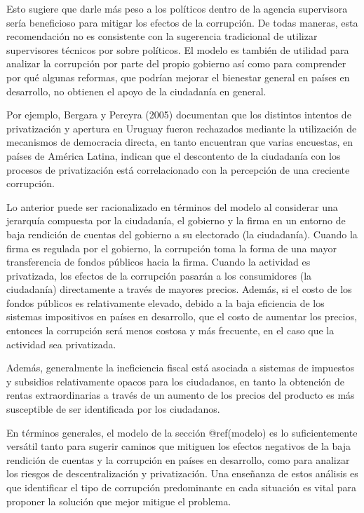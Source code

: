 \documentclass[
  12pt,
  spanish,
]{book}
\begin{document}
Esto sugiere que darle más peso a los políticos dentro de la agencia
supervisora sería beneficioso para mitigar los efectos de la corrupción.
De todas maneras, esta recomendación no es consistente con la sugerencia
tradicional de utilizar supervisores técnicos por sobre políticos. El
modelo es también de utilidad para analizar la corrupción por parte del
propio gobierno así como para comprender por qué algunas reformas, que
podrían mejorar el bienestar general en países en desarrollo, no
obtienen el apoyo de la ciudadanía en general.

Por ejemplo, Bergara y Pereyra (2005) documentan que los distintos
intentos de privatización y apertura en Uruguay fueron rechazados
mediante la utilización de mecanismos de democracia directa, en tanto
\citet{Martimort2009} encuentran que varias encuestas, en países de
América Latina, indican que el descontento de la ciudadanía con los
procesos de privatización está correlacionado con la percepción de una
creciente corrupción.

Lo anterior puede ser racionalizado en términos del modelo al considerar
una jerarquía compuesta por la ciudadanía, el gobierno y la firma en un
entorno de baja rendición de cuentas del gobierno a su electorado (la
ciudadanía). Cuando la firma es regulada por el gobierno, la corrupción
toma la forma de una mayor transferencia de fondos públicos hacia la
firma. Cuando la actividad es privatizada, los efectos de la corrupción
pasarán a los consumidores (la ciudadanía) directamente a través de
mayores precios. Además, si el costo de los fondos públicos es
relativamente elevado, debido a la baja eficiencia de los sistemas
impositivos en países en desarrollo, que el costo de aumentar los
precios, entonces la corrupción será menos costosa y más frecuente, en
el caso que la actividad sea privatizada.

Además, generalmente la ineficiencia fiscal está asociada a sistemas de
impuestos y subsidios relativamente opacos para los ciudadanos, en tanto
la obtención de rentas extraordinarias a través de un aumento de los
precios del producto es más susceptible de ser identificada por los
ciudadanos.

En términos generales, el modelo de la sección @ref(modelo) es lo
suficientemente versátil tanto para sugerir caminos que mitiguen los
efectos negativos de la baja rendición de cuentas y la corrupción en
países en desarrollo, como para analizar los riesgos de
descentralización y privatización. Una enseñanza de estos análisis es
que identificar el tipo de corrupción predominante en cada situación es
vital para proponer la solución que mejor mitigue el problema.
\end{document}
